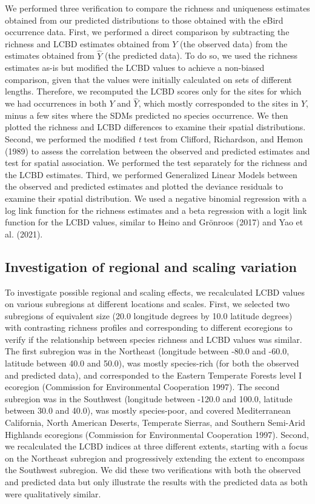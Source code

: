 \documentclass[11pt]{article}
\begin{document}
We performed three verification to compare the richness and uniqueness
estimates obtained from our predicted distributions to those obtained
with the eBird occurrence data. First, we performed a direct comparison
by subtracting the richness and LCBD estimates obtained from \(Y\) (the
observed data) from the estimates obtained from \(\hat{Y}\) (the
predicted data). To do so, we used the richness estimates as-is but
modified the LCBD values to achieve a non-biased comparison, given that
the values were initially calculated on sets of different lengths.
Therefore, we recomputed the LCBD scores only for the sites for which we
had occurrences in both \(Y\) and \(\hat{Y}\), which mostly corresponded
to the sites in \(Y\), minus a few sites where the SDMs predicted no
species occurrence. We then plotted the richness and LCBD differences to
examine their spatial distributions. Second, we performed the modified
\emph{t} test from Clifford, Richardson, and Hemon (1989) to assess the
correlation between the observed and predicted estimates and test for
spatial association. We performed the test separately for the richness
and the LCBD estimates. Third, we performed Generalized Linear Models
between the observed and predicted estimates and plotted the deviance
residuals to examine their spatial distribution. We used a negative
binomial regression with a log link function for the richness estimates
and a beta regression with a logit link function for the LCBD values,
similar to Heino and Grönroos (2017) and Yao et al. (2021).

\hypertarget{investigation-of-regional-and-scaling-variation}{%
\subsection{Investigation of regional and scaling
variation}\label{investigation-of-regional-and-scaling-variation}}

To investigate possible regional and scaling effects, we recalculated
LCBD values on various subregions at different locations and scales.
First, we selected two subregions of equivalent size (20.0 longitude
degrees by 10.0 latitude degrees) with contrasting richness profiles and
corresponding to different ecoregions to verify if the relationship
between species richness and LCBD values was similar. The first
subregion was in the Northeast (longitude between -80.0 and -60.0,
latitude between 40.0 and 50.0), was mostly species-rich (for both the
observed and predicted data), and corresponded to the Eastern Temperate
Forests level I ecoregion (Commission for Environmental Cooperation
1997). The second subregion was in the Southwest (longitude between
-120.0 and 100.0, latitude between 30.0 and 40.0), was mostly
species-poor, and covered Mediterranean California, North American
Deserts, Temperate Sierras, and Southern Semi-Arid Highlands ecoregions
(Commission for Environmental Cooperation 1997). Second, we recalculated
the LCBD indices at three different extents, starting with a focus on
the Northeast subregion and progressively extending the extent to
encompass the Southwest subregion. We did these two verifications with
both the observed and predicted data but only illustrate the results
with the predicted data as both were qualitatively similar.
\end{document}

